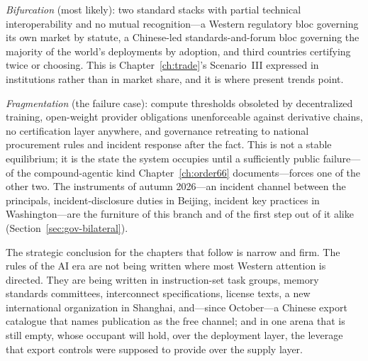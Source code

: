 \emph{Bifurcation} (most likely): two standard stacks with partial technical interoperability and no mutual recognition---a Western regulatory bloc governing its own market by statute, a Chinese-led standards-and-forum bloc governing the majority of the world's deployments by adoption, and third countries certifying twice or choosing. This is Chapter~\ref{ch:trade}'s Scenario~III expressed in institutions rather than in market share, and it is where present trends point.

\emph{Fragmentation} (the failure case): compute thresholds obsoleted by decentralized training, open-weight provider obligations unenforceable against derivative chains, no certification layer anywhere, and governance retreating to national procurement rules and incident response after the fact. This is not a stable equilibrium; it is the state the system occupies until a sufficiently public failure---of the compound-agentic kind Chapter~\ref{ch:order66} documents---forces one of the other two. The instruments of autumn 2026---an incident channel between the principals, incident-disclosure duties in Beijing, incident key practices in Washington---are the furniture of this branch and of the first step out of it alike (Section~\ref{sec:gov-bilateral}).

The strategic conclusion for the chapters that follow is narrow and firm. The rules of the AI era are not being written where most Western attention is directed. They are being written in instruction-set task groups, memory standards committees, interconnect specifications, license texts, a new international organization in Shanghai, and---since October---a Chinese export catalogue that names publication as the free channel; and in one arena that is still empty, whose occupant will hold, over the deployment layer, the leverage that export controls were supposed to provide over the supply layer.
